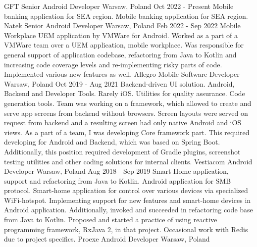 
\cvexperience
  {GFT}
  {Senior Android Developer}
  {Warsaw, Poland}
  {Oct 2022 - Present}
  {
    Mobile banking application for SEA region.
  }
  {
    Mobile banking application for SEA region.
  }
\cvexperience
  {Natek}
  {Senior Android Developer}
  {Warsaw, Poland}
  {Feb 2022 - Sep 2022}
  {
    Mobile Workplace UEM application by VMWare for Android.
  }
  {
    Worked as a part of a VMWare team over a UEM application, mobile workplace. 
    \newline
    Was responsible for general support of application codebase, refactoring from Java to Kotlin and
    increasing code coverage levels and re-implementing risky parts of code.
    Implemented various new features as well.
  }
\cvexperience
  {Allegro}
  {Mobile Software Developer}
  {Warsaw, Poland}
  {Oct 2019 - Aug 2021}
  {
    Backend-driven UI solution. Android, Backend and Developer Tools. Rarely iOS.
    \newline
    Utilities for quality assurance. Code generation tools.
  }
  {
    Team was working on a framework, which allowed to create and serve app screens from backend without browsers.
    \newline
    Screen layouts were served on request from backend and a resulting screen had only native Android and iOS views.
    \newline
    As a part of a team, I was developing Core framework part.
    This required developing for Android and Backend, which was based on Spring Boot.
    Additionally, this position required development of Gradle plugins, screenshot testing utilities and
    other coding solutions for internal clients.
  }
\cvexperience
  {Vestiacom}
  {Android Developer}
  {Warsaw, Poland}
  {Aug 2018 - Sep 2019}
  {
    Smart Home application, support and refactoring from Java to Kotlin.
    \newline
    Android application for SMB protocol.
  }
  {
    Smart-home application for control over various devices via specialized WiFi-hotspot.
    Implementing support for new features and smart-home devices in Android application.
    Additionally, invoked and succeeded in refactoring code base from Java to Kotlin.
    \newline
    Proposed and started a practice of using reactive programming framework, RxJava 2, in that project.
    Occasional work with Redis due to project specifics.
  }
\cvexperience
  {Proexe}
  {Android Developer}
  {Warsaw, Poland}
